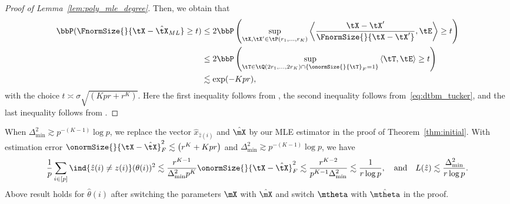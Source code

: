 \documentclass[lettersize,onecolumn,journal]{IEEEtran}
\theoremstyle{definition}
\theoremstyle{definition}
\newcommand{\of}[1]{\left(#1\right)}
\newcommand{\ang}[1]{\left\langle#1\right\rangle}
\begin{document}
{\begin{proof}[Proof of Lemma~\ref{lem:poly_mle_degree}]
Then, we obtain that 
\begin{align}
     \bbP(\FnormSize{}{\tX - \hat \tX_{ML}} \geq t) &\leq 2  \bbP\of{ \sup_{ \tX, \tX' \in \tP(r_1, 
\ldots, r_K)} \ang{ \frac{\tX - \tX'}{\FnormSize{}{\tX - \tX'}}, \tE  } \geq t } \\
     &\leq 2  \bbP\of{ \sup_{ \tT \in \tQ(2r_1, \ldots, 2r_K) \cap \{ \onormSize{}{\tT}_F = 1\} } \ang{ \tT, \tE  } \geq t } \\
     &\lesssim  \exp(-Kpr),
\end{align}
with the choice $t\asymp \sigma \sqrt{(Kpr + r^K)}$. Here the first inequality follows from \citet[Lemma 1]{wang2019multiway}, the second inequality follows from~\eqref{eq:dtbm_tucker}, and the last inequality follows from \citet[Lemma E5]{han2022optimal}.
\end{proof} 

When $\Delta_{\min}^2 \gtrsim p^{-(K-1)} \log p$, we replace the vector $\hat x_{\hat z(i)}$ and $\hat \mX$ by our MLE estimator in the proof of Theorem~\ref{thm:initial}. With estimation error $\onormSize{}{\tX - \hat \tX}_F^2 \lesssim \of{ r^{K} + K p r}$ and $\Delta_{\min}^2 \gtrsim p^{-(K-1)} \log p$, we have 
\begin{align}
      \frac{1}{p} \sum_{i \in [p]} \ind\{ \hat z(i) \neq z(i) \} (\theta(i))^2 \lesssim \frac{r^{K-1}}{\Delta_{\min}^2 p^{K}} \onormSize{}{\tX - \hat \tX}_F^2  \lesssim \frac{r^{K-2}}{p^{K-1} \Delta_{\min}^2} \lesssim \frac{1}{r \log p}, \quad \text{and} \quad  L(\hat z) \lesssim \frac{\Delta_{\min}^2}{r \log p}.
\end{align}
Above result holds for $\hat \theta(i)$ after switching the parameters $\mX$ with $\hat \mX$ and switch $\mtheta$ with $\hat \mtheta$ in the proof. 


}
\end{document}
